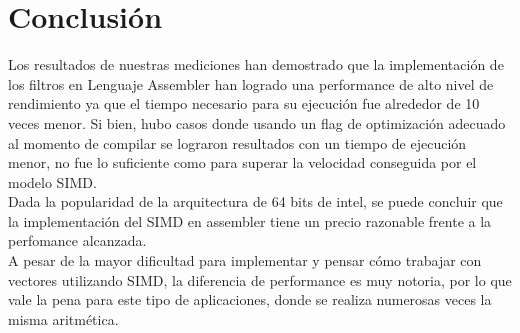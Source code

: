 \documentclass[10pt,a4paper,spanish]{article}
\begin{document}
\begin{center}
\end{center}

\section{Conclusión}

Los resultados de nuestras mediciones han demostrado que la implementación de los filtros en Lenguaje Assembler han logrado una performance de alto nivel de rendimiento ya que el tiempo necesario para su ejecución fue alrededor de 10 veces menor. Si bien, hubo casos donde usando un flag de optimización adecuado al momento de compilar se lograron resultados con un tiempo de ejecución menor, no fue lo suficiente como para superar la velocidad conseguida por el modelo SIMD. \\

Dada la popularidad de la arquitectura de 64 bits de intel, se puede concluir que la implementación del SIMD en assembler tiene un precio razonable frente a la perfomance alcanzada.\\

A pesar de la mayor dificultad para implementar y pensar cómo trabajar con vectores utilizando SIMD, la diferencia de performance es muy notoria, por lo que vale la pena para este tipo de aplicaciones, donde se realiza numerosas veces la misma aritmética.

\end{document}
